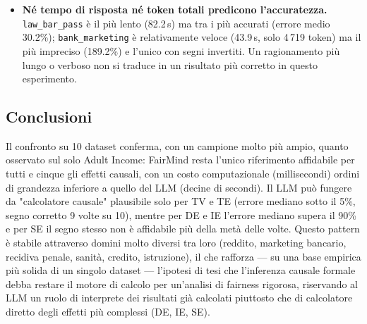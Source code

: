 \begin{itemize}
  \item \textbf{N\'e tempo di risposta n\'e token totali predicono l'accuratezza.} \texttt{law\_bar\_pass} \`e il pi\`u lento (82.2\,s) ma tra i pi\`u accurati (errore medio 30.2\%); \texttt{bank\_marketing} \`e relativamente veloce (43.9\,s, solo 4\,719 token) ma il pi\`u impreciso (189.2\%) e l'unico con segni invertiti. Un ragionamento pi\`u lungo o verboso non si traduce in un risultato pi\`u corretto in questo esperimento.
\end{itemize}

\subsection*{Conclusioni}

Il confronto su 10 dataset conferma, con un campione molto pi\`u ampio, quanto osservato sul solo Adult Income: FairMind resta l'unico riferimento affidabile per tutti e cinque gli effetti causali, con un costo computazionale (millisecondi) ordini di grandezza inferiore a quello del LLM (decine di secondi). Il LLM pu\`o fungere da "calcolatore causale" plausibile solo per TV e TE (errore mediano sotto il 5\%, segno corretto 9 volte su 10), mentre per DE e IE l'errore mediano supera il 90\% e per SE il segno stesso non \`e affidabile pi\`u della met\`a delle volte. Questo pattern \`e stabile attraverso domini molto diversi tra loro (reddito, marketing bancario, recidiva penale, sanit\`a, credito, istruzione), il che rafforza --- su una base empirica pi\`u solida di un singolo dataset --- l'ipotesi di tesi che l'inferenza causale formale debba restare il motore di calcolo per un'analisi di fairness rigorosa, riservando al LLM un ruolo di interprete dei risultati gi\`a calcolati piuttosto che di calcolatore diretto degli effetti pi\`u complessi (DE, IE, SE).
